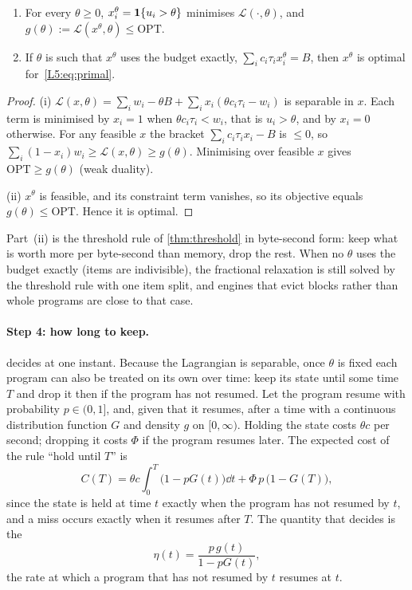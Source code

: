 \begin{proposition}\label{L5:prop:shadow}
\begin{enumerate}[label=(\roman*)]
\item For every $\theta\ge0$, $x^\theta_i=\mathbf{1}\{u_i>\theta\}$ minimises
  $\mathcal{L}(\cdot,\theta)$, and $g(\theta):=\mathcal{L}(x^\theta,\theta)\le\mathrm{OPT}$.
\item If $\theta$ is such that $x^\theta$ uses the budget exactly,
  $\sum_ic_i\tau_ix^\theta_i=B$, then $x^\theta$ is optimal
  for~\eqref{L5:eq:primal}.
\end{enumerate}
\end{proposition}

\begin{proof}
(i) $\mathcal{L}(x,\theta)=\sum_iw_i-\theta B+\sum_ix_i(\theta c_i\tau_i-w_i)$
is separable in $x$. Each term is minimised by $x_i=1$ when
$\theta c_i\tau_i<w_i$, that is $u_i>\theta$, and by $x_i=0$ otherwise.
For any feasible $x$ the bracket $\sum_ic_i\tau_ix_i-B$ is $\le0$, so
$\sum_i(1-x_i)w_i\ge\mathcal{L}(x,\theta)\ge g(\theta)$. Minimising over
feasible $x$ gives $\mathrm{OPT}\ge g(\theta)$ (weak duality).

(ii) $x^\theta$ is feasible, and its constraint term vanishes, so its
objective equals $g(\theta)\le\mathrm{OPT}$. Hence it is optimal.
\end{proof}

Part~(ii) is the threshold rule of \cref{thm:threshold} in byte-second form:
keep what is worth more per byte-second than memory, drop the rest. When
no $\theta$ uses the budget exactly (items are indivisible), the fractional
relaxation is still solved by the threshold rule with one item split, and
engines that evict blocks rather than whole programs are close to that case.

\paragraph{Step 4: how long to keep.}  decides at one instant.
Because the Lagrangian is separable, once $\theta$ is fixed each program can also be
treated on its own over time: keep its state until some time $T$ and drop it then if the
program has not resumed. Let the program resume with probability $p\in(0,1]$, and, given
that it resumes, after a time with a continuous distribution function $G$ and density
$g$ on $[0,\infty)$. Holding the state costs $\theta c$ per second; dropping it costs
$\Phi$ if the program resumes later. The expected cost of the rule ``hold until $T$'' is
\begin{equation}\label{L5:eq:hold-cost}
  C(T)=\theta c\int_0^T\bigl(1-pG(t)\bigr)\dd t+\Phi\,p\,\bigl(1-G(T)\bigr),
\end{equation}
since the state is held at time $t$ exactly when the program has not resumed by $t$,
and a miss occurs exactly when it resumes after $T$. The quantity that decides is the
\[
  \eta(t)=\frac{p\,g(t)}{1-pG(t)},
\]
the rate at which a program that has not resumed by $t$ resumes at $t$.

